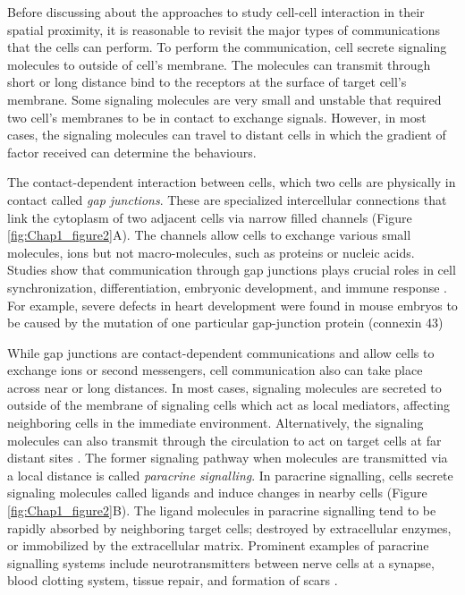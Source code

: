 Before discussing about the approaches to study cell-cell interaction in their spatial proximity, it is reasonable to revisit the major types of communications that the cells can perform. To perform the communication, cell secrete signaling molecules to outside of cell's membrane. The molecules can transmit through short or long distance bind to the receptors at the surface of target cell's membrane. Some signaling molecules are very small and unstable that required two cell's membranes to be in contact to exchange signals. However, in most cases, the signaling molecules can travel to distant cells in which the gradient of factor received can determine the behaviours.         

The contact-dependent interaction between cells, which two cells are physically in contact called \textit{gap junctions}. These are specialized intercellular connections that link the cytoplasm of two adjacent cells via narrow filled channels (Figure \ref{fig:Chap1_figure2}A). The channels allow cells to exchange various small molecules, ions but not macro-molecules, such as proteins or nucleic acids. Studies show that communication through gap junctions plays crucial roles in cell synchronization, differentiation, embryonic development, and immune response \cite{white1999genetic, vinken2006connexins}. For example, severe defects in heart development were found in mouse embryos to be caused by the mutation of one particular gap-junction protein (connexin 43)

While gap junctions are contact-dependent communications and allow cells to exchange ions or second messengers, cell communication also can take place across near or long distances. In most cases, signaling molecules are secreted to outside of the membrane of signaling cells which act as local mediators, affecting neighboring cells in the immediate environment. Alternatively, the signaling molecules can also transmit through the circulation to act on target cells at far distant sites \cite{cooper2004cell, alberts2018molecular}. The former signaling pathway when molecules are transmitted via a local distance is called \textit{paracrine signalling}. In paracrine signalling, cells secrete signaling molecules called ligands and induce changes in nearby cells (Figure \ref{fig:Chap1_figure2}B). The ligand molecules in paracrine signalling tend to be rapidly absorbed by neighboring target cells; destroyed by extracellular enzymes, or immobilized by the extracellular matrix. Prominent examples of paracrine signalling systems include neurotransmitters between nerve cells at a synapse,  blood clotting system, tissue repair, and formation of scars
\cite{huang1998gap}. 

